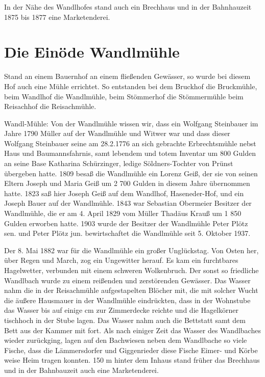 \documentclass[12pt,a4pager]{book}
\begin{document}
In der Nähe des Wandlhofes stand auch ein Brechhaus und in der Bahnhauzeit 1875
bis 1877 eine Marketenderei.

\section{Die Einöde Wandlmühle}

Stand an einem Bauernhof an einem fließenden Gewässer, so wurde bei diesem Hof
auch eine Mühle errichtet. So entstanden bei dem Bruckhof die Bruckmühle, beim
Wandlhof die Wandlmühle, beim Stömmerhof die Stömmermühle beim Reisachhof die
Reisachmühle.

Wandl-Mühle: Von der Wandlmühle wissen wir, dass ein Wolfgang Steinbauer im
Jahre 1790 Müller auf der Wandlmühle und Witwer war und dass dieser Wolfgang
Steinbauer seine am 28.2.1776 an sich gebrachte Erbrechtsmühle nebst Haus und
Baumannsfahrnis, samt lebendem und totem Inventar um 800 Gulden an seine Base
Katharina Schürzinger, ledige Söldners-Tochter von Prünst übergeben hatte. 1809
besaß die Wandlmühle ein Lorenz Geiß, der sie von seinen Eltern Joseph und Maria
Geiß um 2 700 Gulden in diesem Jahre übernommen hatte. 1823 saß hier Joseph Geiß
auf dem Wandlhof, Haseneder-Hof, und ein Joseph Bauer auf der Wandlmühle. 1843
war Sebastian Obermeier Besitzer der Wandlmühle, die er am 4. April 1829 vom
Müller Thadäus Krauß um 1 850 Gulden erworben hatte. 1903 wurde der Besitzer der
Wandlmühle Peter Plötz sen. und Peter Plötz jun. bewirtschaftet die Wandlmühle
seit 5. Oktober 1937.

Der 8. Mai 1882 war für die Wandlmühle ein großer Unglückstag. Von Osten her,
über Regen und March, zog ein Ungewitter herauf. Es kam ein furchtbares
Hagelwetter, verbunden mit einem schweren Wolkenbruch. Der sonst so friedliche
Wandlbach wurde zu einem reißenden und zerstörenden Gewässer. Das Wasser nahm
die in der Reisachmühle aufgestapelten Blöcher mit, die mit solcher Wucht die
äußere Hausmauer in der Wandlmühle eindrückten, dass in der Wohnstube das Wasser
bis auf einige cm zur Zimmerdecke reichte und die Hagelkörner tischhoch in der
Stube lagen. Das Wasser nahm auch die Bettstatt samt dem Bett aus der Kammer mit
fort. Als nach einiger Zeit das Wasser des Wandlbaches wieder zurückging, lagen
auf den Bachwiesen neben dem Wandlbache so viele Fische, dass die Lämmersdorfer
und Giggenrieder diese Fische Eimer- und Körbe weise Heim tragen konnten. 150 m
hinter dem Inhaus stand früher das Brechhaus und in der Bahnbauzeit auch eine
Marketenderei.
\end{document}
